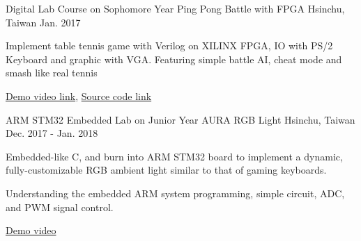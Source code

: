 

\begin{cventries}

\cventry
    {Digital Lab Course on Sophomore Year} %
    {Ping Pong Battle with FPGA} %
    {Hsinchu, Taiwan} %
    {Jan. 2017} %
    {
      \begin{cvitems} %
        \item {Implement table tennis game with Verilog on XILINX FPGA, IO with PS/2 Keyboard and graphic with VGA. Featuring simple battle AI, cheat mode and smash like real tennis}
        \item {\href{https://www.youtube.com/watch?v=R4cgMN5uRBE}{Demo video link}}, \href{https://github.com/Alfons0329/DLAB_Fall_2016/tree/master/Final\%20project\%20rev2.0\%20with\%20kill\%20and\%20combo}{Source code link}
      \end{cvitems}
    }

\cventry
    {ARM STM32 Embedded Lab on Junior Year} %
    {AURA RGB Light} %
    {Hsinchu, Taiwan} %
    {Dec. 2017 - Jan. 2018} %
    {
      \begin{cvitems} %
        \item Embedded-like C, and burn into ARM STM32 board to implement a dynamic, fully-customizable RGB ambient light similar to that of gaming keyboards. 
        \item Understanding the embedded ARM system programming, simple circuit, ADC, and PWM signal control.
        \item \href{https://www.youtube.com/watch?v=FdnTKmdjxIc}{Demo video}
      \end{cvitems}
    }


\end{cventries}
